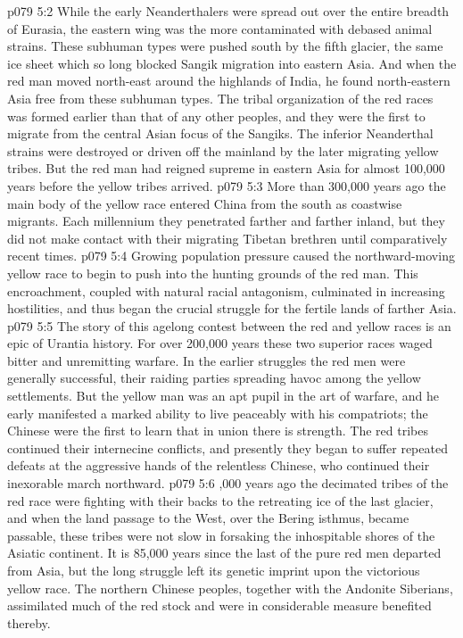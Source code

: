 \vs p079 5:2 While the early Neanderthalers were spread out over the entire breadth of Eurasia, the eastern wing was the more contaminated with debased animal strains. These subhuman types were pushed south by the fifth glacier, the same ice sheet which so long blocked Sangik migration into eastern Asia. And when the red man moved north\hyp{}east around the highlands of India, he found north\hyp{}eastern Asia free from these subhuman types. The tribal organization of the red races was formed earlier than that of any other peoples, and they were the first to migrate from the central Asian focus of the Sangiks. The inferior Neanderthal strains were destroyed or driven off the mainland by the later migrating yellow tribes. But the red man had reigned supreme in eastern Asia for almost 100,000 years before the yellow tribes arrived.
\vs p079 5:3 \pc More than 300,000 years ago the main body of the yellow race entered China from the south as coastwise migrants. Each millennium they penetrated farther and farther inland, but they did not make contact with their migrating Tibetan brethren until comparatively recent times.
\vs p079 5:4 Growing population pressure caused the northward\hyp{}moving yellow race to begin to push into the hunting grounds of the red man. This encroachment, coupled with natural racial antagonism, culminated in increasing hostilities, and thus began the crucial struggle for the fertile lands of farther Asia.
\vs p079 5:5 The story of this agelong contest between the red and yellow races is an epic of Urantia history. For over 200,000 years these two superior races waged bitter and unremitting warfare. In the earlier struggles the red men were generally successful, their raiding parties spreading havoc among the yellow settlements. But the yellow man was an apt pupil in the art of warfare, and he early manifested a marked ability to live peaceably with his compatriots; the Chinese were the first to learn that in union there is strength. The red tribes continued their internecine conflicts, and presently they began to suffer repeated defeats at the aggressive hands of the relentless Chinese, who continued their inexorable march northward.
\vs p079 5:6 ,000 years ago the decimated tribes of the red race were fighting with their backs to the retreating ice of the last glacier, and when the land passage to the West, over the Bering isthmus, became passable, these tribes were not slow in forsaking the inhospitable shores of the Asiatic continent. It is 85,000 years since the last of the pure red men departed from Asia, but the long struggle left its genetic imprint upon the victorious yellow race. The northern Chinese peoples, together with the Andonite Siberians, assimilated much of the red stock and were in considerable measure benefited thereby.

